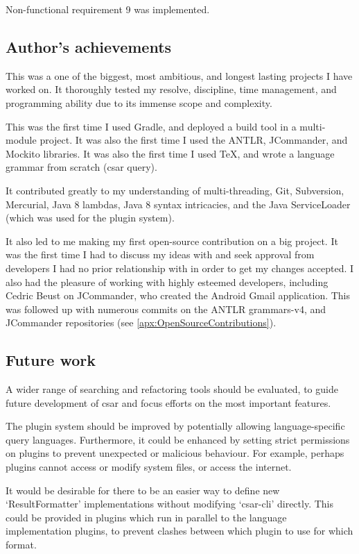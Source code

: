 \documentclass[12pt, letterpaper]{article}
\begin{document}
Non-functional requirement 9 was implemented.

\subsection{Author's achievements}
This was a one of the biggest, most ambitious, and longest lasting projects I have worked on.
It thoroughly tested my resolve, discipline, time management, and programming ability due to its immense scope and complexity.

This was the first time I used Gradle, and deployed a build tool in a multi-module project.
It was also the first time I used the ANTLR, JCommander, and Mockito libraries.
It was also the first time I used TeX, and wrote a language grammar from scratch (csar query).

It contributed greatly to my understanding of multi-threading, Git, Subversion, Mercurial, Java 8 lambdas, Java 8 syntax intricacies, and the Java ServiceLoader (which was used for the plugin system).

It also led to me making my first open-source contribution on a big project.
It was the first time I had to discuss my ideas with and seek approval from developers I had no prior relationship with in order to get my changes accepted.
I also had the pleasure of working with highly esteemed developers, including Cedric Beust on JCommander, who created the Android Gmail application.
This was followed up with numerous commits on the ANTLR grammars-v4, and JCommander repositories (see \ref{apx:OpenSourceContributions}).

\subsection{Future work}
A wider range of searching and refactoring tools should be evaluated, to guide future development of csar and focus efforts on the most important features.

The plugin system should be improved by potentially allowing language-specific query languages.
Furthermore, it could be enhanced by setting strict permissions on plugins to prevent unexpected or malicious behaviour.
For example, perhaps plugins cannot access or modify system files, or access the internet.

It would be desirable for there to be an easier way to define new `ResultFormatter' implementations without modifying `csar-cli' directly.
This could be provided in plugins which run in parallel to the language implementation plugins, to prevent clashes between which plugin to use for which format.
\end{document}
